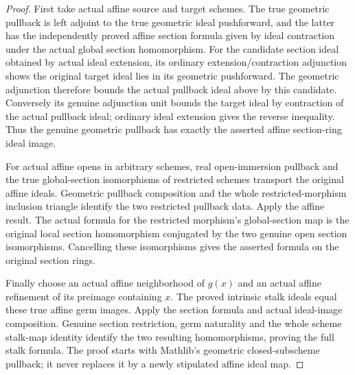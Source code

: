 \begin{proof}
First take actual affine source and target schemes. The true geometric
pullback is left adjoint to the true geometric ideal pushforward, and the
latter has the independently proved affine section formula given by
ideal contraction under the actual global section homomorphism. For the
candidate section ideal obtained by actual ideal extension, its ordinary
extension/contraction adjunction shows the original target ideal lies in
its geometric pushforward. The geometric adjunction therefore bounds the
actual pullback ideal above by this candidate. Conversely its genuine
adjunction unit bounds the target ideal by contraction of the actual
pullback ideal; ordinary ideal extension gives the reverse inequality.
Thus the genuine geometric pullback has exactly the asserted affine
section-ring ideal image.

For actual affine opens in arbitrary schemes, real open-immersion
pullback and the true global-section isomorphisms of restricted schemes
transport the original affine ideals. Geometric pullback composition and
the whole restricted-morphism inclusion triangle identify the two
restricted pullback data. Apply the affine result. The actual formula
for the restricted morphism's global-section map is the original local
section homomorphism conjugated by the two genuine open section
isomorphisms. Cancelling these isomorphisms gives the asserted formula
on the original section rings.

Finally choose an actual affine neighborhood of $g(x)$ and an actual
affine refinement of its preimage containing $x$. The proved
intrinsic stalk ideals equal these true affine germ images. Apply the
section formula and actual ideal-image composition. Genuine section
restriction, germ naturality and the whole scheme stalk-map identity
identify the two resulting homomorphisms, proving the full stalk formula.
The proof starts with Mathlib's geometric closed-subscheme pullback;
it never replaces it by a newly stipulated affine ideal map.
\end{proof}

